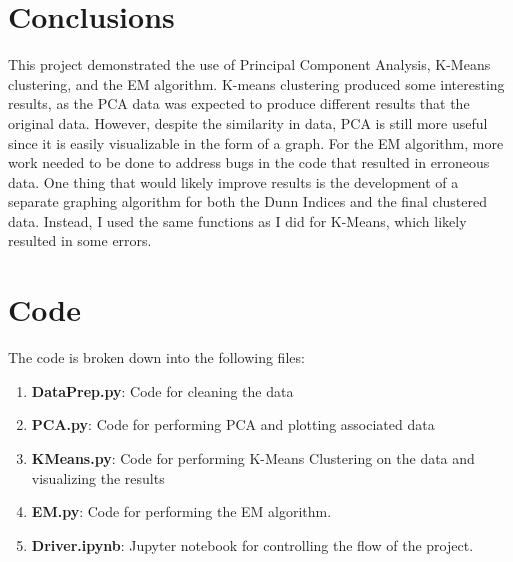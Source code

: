 \documentclass[12pt]{article}
\begin{document}
    \newpage
    \section{Conclusions}
    This project demonstrated the use of Principal Component Analysis, K-Means clustering, and the EM algorithm. K-means clustering produced some interesting results, as the PCA data was expected to produce different results that the original data. However, despite the similarity in data, PCA is still more useful since it is easily visualizable in the form of a graph. For the EM algorithm, more work needed to be done to address bugs in the code that resulted in erroneous data. One thing that would likely improve results is the development of a separate graphing algorithm for both the Dunn Indices and the final clustered data. Instead, I used the same functions as I did for K-Means, which likely resulted in some errors.
	
	\section{Code}
	The code is broken down into the following files:
	\begin{enumerate}
		\item \textbf{DataPrep.py}: Code for cleaning the data
		\item \textbf{PCA.py}: Code for performing PCA and plotting associated data
		\item \textbf{KMeans.py}: Code for performing K-Means Clustering on the data and visualizing the results
		\item \textbf{EM.py}: Code for performing the EM algorithm.
		\item \textbf{Driver.ipynb}: Jupyter notebook for controlling the flow of the project.
	\end{enumerate}

    \newpage
\end{document}
